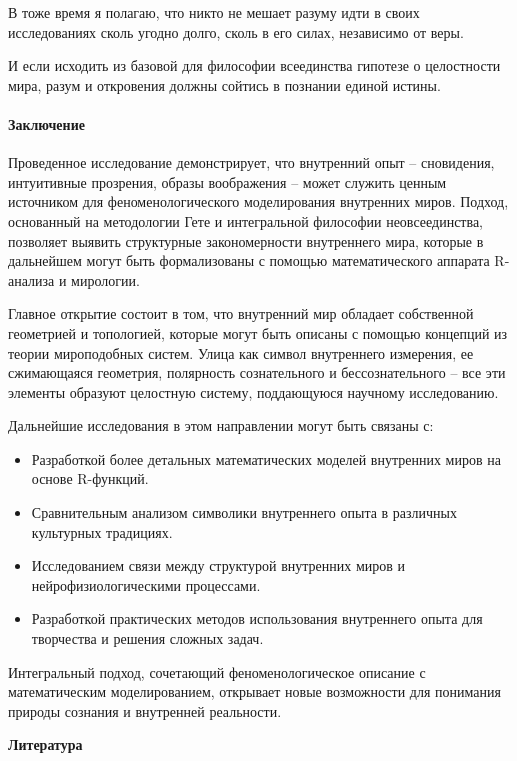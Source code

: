 В тоже время я полагаю, что никто не мешает разуму идти в своих исследованиях сколь угодно долго, сколь в его силах, независимо от веры.

И если исходить из базовой для философии всеединства гипотезе о целостности мира, разум и откровения должны сойтись в познании единой истины.

\paragraph*{Заключение}
Проведенное исследование демонстрирует, что внутренний опыт – сновидения, интуитивные прозрения, образы воображения – может служить ценным источником для феноменологического моделирования внутренних миров. Подход, основанный на методологии Гете и интегральной философии неовсеединства, позволяет выявить структурные закономерности внутреннего мира, которые в дальнейшем могут быть формализованы с помощью математического аппарата R-анализа и мирологии.

Главное открытие состоит в том, что внутренний мир обладает собственной геометрией и топологией, которые могут быть описаны с помощью концепций из теории мироподобных систем. Улица как символ внутреннего измерения, ее сжимающаяся геометрия, полярность сознательного и бессознательного – все эти элементы образуют целостную систему, поддающуюся научному исследованию.

Дальнейшие исследования в этом направлении могут быть связаны с:
\begin{itemize}
	\item Разработкой более детальных математических моделей внутренних миров на основе R-функций.
	\item Сравнительным анализом символики внутреннего опыта в различных культурных традициях.
	\item Исследованием связи между структурой внутренних миров и нейрофизиологическими процессами.
	\item Разработкой практических методов использования внутреннего опыта для творчества и решения сложных задач.
\end{itemize}

Интегральный подход, сочетающий феноменологическое описание с математическим моделированием, открывает новые возможности для понимания природы сознания и внутренней реальности.

\begin{center}
	\textbf{Литература}
\end{center}

